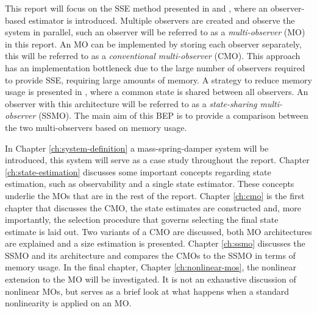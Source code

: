 This report will focus on the SSE method presented in \cite{Chong2015ObservabilityAttacks} and \cite{Chong2020AAttacks}, where an observer-based estimator is introduced. Multiple observers are created and observe the system in parallel, such an observer will be referred to as a \textit{multi-observer} (MO) in this report. An MO can be implemented by storing each observer separately, this will be referred to as a \textit{conventional multi-observer} (CMO). This approach has an implementation bottleneck due to the large number of observers required to provide SSE, requiring large amounts of memory. A strategy to reduce memory usage is presented in \cite{Chong2023MemoryAlgorithms}, where a common state is shared between all observers. An observer with this architecture will be referred to as a \textit{state-sharing multi-observer} (SSMO). The main aim of this BEP is to provide a comparison between the two multi-observers based on memory usage.

In Chapter \ref{ch:system-definition} a mass-spring-damper system will be introduced, this system will serve as a case study throughout the report. Chapter \ref{ch:state-estimation} discusses some important concepts regarding state estimation, such as observability and a single state estimator. These concepts underlie the MOs that are in the rest of the report. Chapter \ref{ch:cmo} is the first chapter that discusses the CMO, the state estimates are constructed and, more importantly, the selection procedure that governs selecting the final state estimate is laid out. Two variants of a CMO are discussed, both MO architectures are explained and a size estimation is presented. Chapter \ref{ch:ssmo} discusses the SSMO and its architecture and compares the CMOs to the SSMO in terms of memory usage. In the final chapter, Chapter \ref{ch:nonlinear-mos}, the nonlinear extension to the MO will be investigated. It is not an exhaustive discussion of nonlinear MOs, but serves as a brief look at what happens when a standard nonlinearity is applied on an MO.